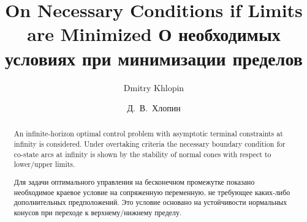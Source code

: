 \begin{englishtitle}
		\title{On Necessary Conditions  if  Limits are Minimized
		}
		\author{Dmitry Khlopin}

		\maketitle

		\begin{abstract}

	An infinite-horizon optimal control problem	with asymptotic terminal constraints at infinity is considered. Under overtaking criteria the necessary boundary condition for co-state arcs at infinity is shown by	the stability of normal cones with respect to lower/upper limits.

\end{abstract}
	\end{englishtitle}




\title{О необходимых условиях при минимизации пределов %
}
\author{Д.~В.~Хлопин
} %

\maketitle

\begin{abstract}
	   Для задачи оптимального управления на бесконечном промежутке  показано необходимое краевое условие на сопряженную переменную, не требующее каких-либо дополнительных предположений. Это условие основано на устойчивости  нормальных конусов при переходе к верхнему/нижнему пределу.

\end{abstract}



